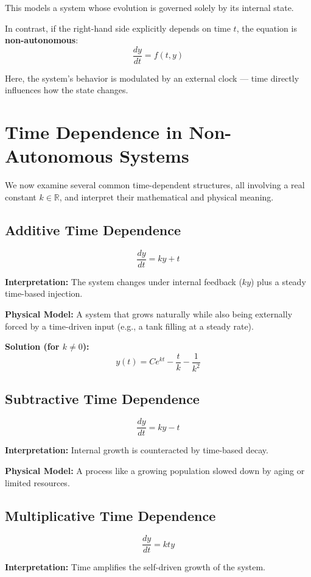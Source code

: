 \documentclass[12pt]{article}
\begin{document}
	This models a system whose evolution is governed solely by its internal state.
	
	In contrast, if the right-hand side explicitly depends on time $t$, the equation is \textbf{non-autonomous}:  
	$$
	\frac{dy}{dt} = f(t, y)
	$$
	
	Here, the system’s behavior is modulated by an external clock — time directly influences how the state changes.
	
	\section{Time Dependence in Non-Autonomous Systems}
	
	We now examine several common time-dependent structures, all involving a real constant $k \in \mathbb{R}$, and interpret their mathematical and physical meaning.
	
	\subsection{Additive Time Dependence}
	$$
	\frac{dy}{dt} = ky + t
	$$
	
	\textbf{Interpretation:} The system changes under internal feedback ($ky$) plus a steady time-based injection.
	
	\textbf{Physical Model:} A system that grows naturally while also being externally forced by a time-driven input (e.g., a tank filling at a steady rate).
	
	\textbf{Solution (for $k \neq 0$):}  
	$$
	y(t) = Ce^{kt} - \frac{t}{k} - \frac{1}{k^2}
	$$
	
	\subsection{Subtractive Time Dependence}
	$$
	\frac{dy}{dt} = ky - t
	$$
	
	\textbf{Interpretation:} Internal growth is counteracted by time-based decay.
	
	\textbf{Physical Model:} A process like a growing population slowed down by aging or limited resources.
	
	\subsection{Multiplicative Time Dependence}
	$$
	\frac{dy}{dt} = kty
	$$
	
	\textbf{Interpretation:} Time amplifies the self-driven growth of the system.
	
\end{document}
